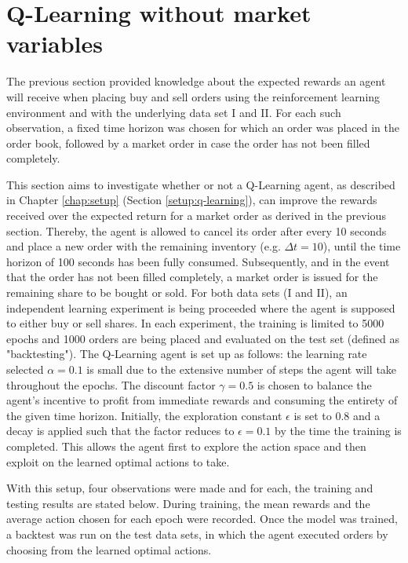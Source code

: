 \section{Q-Learning without market variables}
\label{sec:eval-qlearn}
The previous section provided knowledge about the expected rewards an agent will receive when placing buy and sell orders using the reinforcement learning environment and with the underlying data set I and II.
For each such observation, a fixed time horizon was chosen for which an order was placed in the order book, followed by a market order in case the order has not been filled completely.

This section aims to investigate whether or not a Q-Learning agent, as described in Chapter \ref{chap:setup} (Section \ref{setup:q-learning}), can improve the rewards received over the expected return for a market order as derived in the previous section.
Thereby, the agent is allowed to cancel its order after every 10 seconds and place a new order with the remaining inventory (e.g. $\Delta{t}=10$), until the time horizon of 100 seconds has been fully consumed.
Subsequently, and in the event that the order has not been filled completely, a market order is issued for the remaining share to be bought or sold.
For both data sets (I and II), an independent learning experiment is being proceeded where the agent is supposed to either buy or sell shares.
In each experiment, the training is limited to 5000 epochs and 1000 orders are being placed and evaluated on the test set (defined as "backtesting").
The Q-Learning agent is set up as follows:
the learning rate selected $\alpha=0.1$ is small due to the extensive number of steps the agent will take throughout the epochs.
The discount factor $\gamma=0.5$ is chosen to balance the agent's incentive to profit from immediate rewards and consuming the entirety of the given time horizon.
Initially, the exploration constant $\epsilon$ is set to 0.8 and a decay is applied such that the factor reduces to $\epsilon=0.1$ by the time the training is completed.
This allows the agent first to explore the action space and then exploit on the learned optimal actions to take.

With this setup, four observations were made and for each, the training and testing results are stated below.
During training, the mean rewards and the average action chosen for each epoch were recorded.
Once the model was trained, a backtest was run on the test data sets, in which the agent executed orders by choosing from the learned optimal actions.

